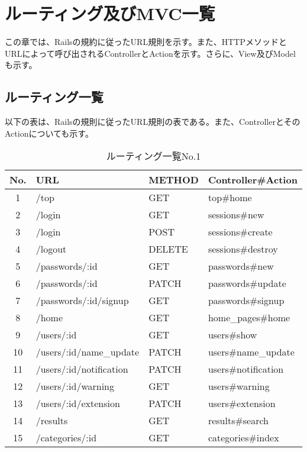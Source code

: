\documentclass[a4j]{jarticle}
\begin{document}
\section{ルーティング及びMVC一覧}
この章では、Railsの規約に従ったURL規則を示す。また、HTTPメソッドとURLによって呼び出されるControllerとActionを示す。さらに、View及びModelも示す。
\newpage
\subsection{ルーティング一覧}
以下の表は、Railsの規則に従ったURL規則の表である。また、ControllerとそのActionについても示す。



\begin{table}[htb]
  \caption{ルーティング一覧No.1}
  \centering
  \begin{tabular}{|c|l|l||l|} \hline
   No. & URL & METHOD & Controller\#Action \\ \hline \hline

   1 & /top & GET & top\#home \\ \hline

	 2 & /login & GET & sessions\#new \\
   3 & /login & POST & sessions\#create \\
	 4 & /logout & DELETE & sessions\#destroy \\ \hline

	 5 &	/passwords/:id & GET & passwords\#new \\
	 6 & /passwords/:id	& PATCH	& passwords\#update \\
   7 & /passwords/:id/signup & GET & passwords\#signup \\ \hline

	 8 &	/home	& GET & home\_pages\#home \\ \hline

	 9 &	/users/:id & GET & users\#show \\
	 10 &	/users/:id/name\_update & PATCH & users\#name\_update \\
   11 & /users/:id/notification & PATCH & users\#notification \\
   12 & /users/:id/warning & GET & users\#warning \\
   13 & /users/:id/extension & PATCH & users\#extension \\ \hline

	14 &	/results & GET & results\#search \\ \hline

	15 &	/categories/:id & GET & categories\#index \\ \hline


\end{tabular}
\end{table}
\end{document}
